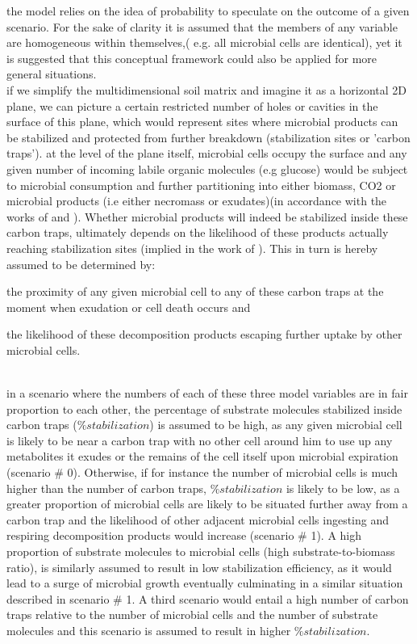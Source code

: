 	the model relies  on the idea of probability to speculate on the outcome of a given scenario.
	For the sake of clarity it is assumed that the members of any variable are homogeneous within themselves,( e.g. all microbial cells are identical), yet it is suggested that this conceptual framework could also be applied for more general situations.\\
	if we simplify the multidimensional soil matrix and imagine it as a horizontal 2D plane, we can picture a certain restricted number of holes or cavities in the surface of this plane, which would represent sites where microbial products can be stabilized and protected from further breakdown (stabilization sites or 'carbon traps'). at the level of the plane itself, microbial cells occupy the surface and any given number of incoming labile organic molecules (e.g glucose) would be subject to microbial consumption and further partitioning into either biomass, CO2 or microbial products (i.e either necromass or exudates)(in accordance with the works of \citeauthor{fischer2010} and \citeauthor{gunina2014}). Whether microbial products will indeed be stabilized inside these carbon traps, ultimately depends on the likelihood of these products actually reaching stabilization sites (implied in the work of \citeauthor{kravchenko2015}). This in turn is hereby assumed to be determined by:
	\begin{enumerate*}[label=(\arabic*)]
		\item the proximity of any given microbial cell to any of these carbon traps at the moment when exudation or cell death occurs and
		\item the likelihood of these decomposition products escaping further uptake by other microbial cells.
	\end{enumerate*}\\
	 in a scenario where the numbers of each of these three model variables are in fair proportion to each other, the percentage of substrate molecules stabilized inside carbon traps ($ \%stabilization $) is assumed to be high, as any given microbial cell is likely to be near a carbon trap with no other cell around him to use up any metabolites it exudes or the remains of the cell itself upon microbial expiration (scenario \# 0). Otherwise, if for instance the number of microbial cells is much higher than the number of carbon traps, $ \%stabilization  $ is likely to be low, as a greater proportion of microbial cells are likely to be situated further away from a carbon trap and the likelihood of other adjacent microbial cells ingesting and respiring decomposition products would increase (scenario \# 1). A high proportion of substrate molecules to microbial cells (high substrate-to-biomass ratio),  is similarly assumed to result in low stabilization efficiency, as it would lead to a surge  of microbial growth eventually culminating in a similar situation described in scenario \# 1. A third scenario would entail a high number of carbon traps relative to the number of microbial cells and the number of substrate molecules and this scenario is assumed to result in higher $ \%stabilization $.\\

